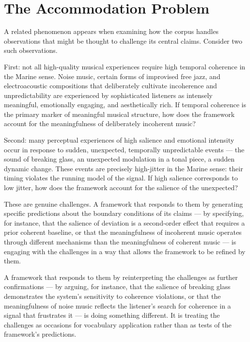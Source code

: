 \section{The Accommodation Problem}
\label{sec:accommodation}

A related phenomenon appears when examining how the corpus
handles observations that might be thought to challenge its
central claims. Consider two such observations.

First: not all high-quality musical experiences require high
temporal coherence in the Marine sense. Noise music, certain
forms of improvised free jazz, and electroacoustic compositions
that deliberately cultivate incoherence and unpredictability
are experienced by sophisticated listeners as intensely
meaningful, emotionally engaging, and aesthetically rich.
If temporal coherence is the primary marker of meaningful
musical structure, how does the framework account for the
meaningfulness of deliberately incoherent music?

Second: many perceptual experiences of high salience and
emotional intensity occur in response to sudden, unexpected,
temporally unpredictable events --- the sound of breaking
glass, an unexpected modulation in a tonal piece, a sudden
dynamic change. These events are precisely high-jitter in
the Marine sense: their timing violates the running model
of the signal. If high salience corresponds to low jitter,
how does the framework account for the salience of the
unexpected?

These are genuine challenges. A framework that responds to
them by generating specific predictions about the boundary
conditions of its claims --- by specifying, for instance,
that the salience of deviation is a second-order effect
that requires a prior coherent baseline, or that the
meaningfulness of incoherent music operates through
different mechanisms than the meaningfulness of coherent
music --- is engaging with the challenges in a way that
allows the framework to be refined by them.

A framework that responds to them by reinterpreting the
challenges as further confirmations --- by arguing, for
instance, that the salience of breaking glass demonstrates
the system's sensitivity to coherence violations, or that
the meaningfulness of noise music reflects the listener's
search for coherence in a signal that frustrates it ---
is doing something different. It is treating the challenges
as occasions for vocabulary application rather than as
tests of the framework's predictions.


